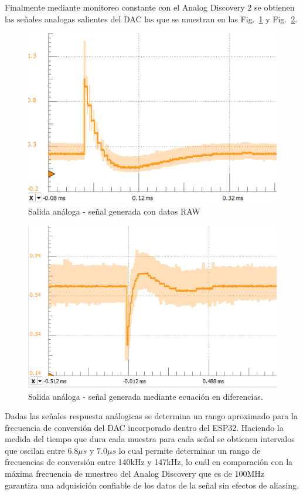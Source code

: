 \documentclass[conference]{IEEEtran}
\begin{document}
{Finalmente mediante monitoreo constante con el Analog Discovery 2 se obtienen las señales analogas salientes del DAC las que se muestran en las Fig.~\ref{predefined_neutrino} y Fig.~\ref{eq_dif_neutrino_img}.

\begin{figure}[H]
\centerline{\includegraphics[scale=0.5]{datos_predefinidos_analog.png}}
        \caption{Salida análoga - señal generada con datos RAW}
        \label{predefined_neutrino}
        \end{figure}

\begin{figure}[H]
\centerline{\includegraphics[scale=0.4]{signal_eq_dif.png}}
        \caption{Salida análoga - señal generada mediante ecuación en diferencias.}
        \label{eq_dif_neutrino_img}
        \end{figure}

Dadas las señales respuesta análogicas se determina un rango aproximado para la frecuencia de conversión del DAC incorporado dentro del ESP32. Haciendo la medida del tiempo que dura cada muestra para cada señal se obtienen intervalos que oscilan entre $6.8\mu s$ y $7.0\mu s$ lo cual permite determinar un rango de frecuencias de conversión entre 140kHz y 147kHz, lo cuál en comparación con la máxima frecuencia de muestreo del Analog Discovery que es de 100MHz garantiza una adquisición confiable de los datos de la señal sin efectos de aliasing.

}
\end{document}
